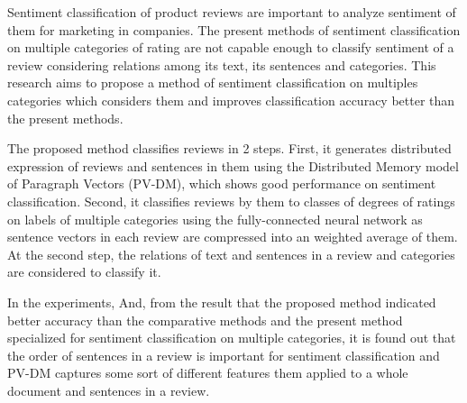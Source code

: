 Sentiment classification of product reviews are important
to analyze sentiment of them for marketing in companies.
The present methods of sentiment classification
on multiple categories of rating
are not capable enough to classify sentiment of a review
considering relations among its text, its sentences and categories.
This research aims to propose a method of sentiment classification
on multiples categories
which considers them and improves classification accuracy better
than the present methods.

The proposed method classifies reviews in 2 steps.
First, it generates distributed expression of reviews and sentences in them
using the Distributed  Memory model of Paragraph Vectors (PV-DM),
which shows good performance on sentiment classification.
Second, it classifies reviews by them to classes of degrees of ratings
on labels of multiple categories using the fully-connected neural network
as sentence vectors in each review are compressed
into an weighted average of them.
At the second step, the relations of text and sentences in a review
and categories are considered to classify it.

In the experiments,
And, from the result that the proposed method indicated better accuracy
than the comparative methods and the present method specialized
for sentiment classification on multiple categories,
it is found out that
the order of sentences in a review is important for sentiment classification
and PV-DM captures some sort of different features them
applied to a whole document and sentences in a review.
